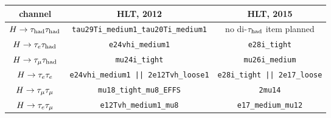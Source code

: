 \begin{tabular}{c|c|c}
  channel      & HLT, 2012                   & HLT, 2015 \\
  \hline\hline
  $H\rightarrow\tau_\text{had}\tau_\text{had}$ & \texttt{tau29Ti\_medium1\_tau20Ti\_medium1} & no di-$\tau_\text{had}$ item planned \\
  \hline
  $H\rightarrow\tau_e \tau_\text{had}$ & \texttt{e24vhi\_medium1}                    & \texttt{e28i\_tight}                 \\
  $H\rightarrow\tau_\mu \tau_\text{had}$ & \texttt{mu24i\_tight}                       & \texttt{mu26i\_medium}               \\
  \hline
  $H\rightarrow\tau_e \tau_e$ & \texttt{e24vhi\_medium1 || 2e12Tvh\_loose1} & \texttt{e28i\_tight || 2e17\_loose}  \\
  $H\rightarrow\tau_\mu \tau_\mu$ & \texttt{mu18\_tight\_mu8\_EFFS}             & \texttt{2mu14}                       \\
  $H\rightarrow\tau_e \tau_\mu$ & \texttt{e12Tvh\_medium1\_mu8}               & \texttt{e17\_medium\_mu12}           \\
\end{tabular}

